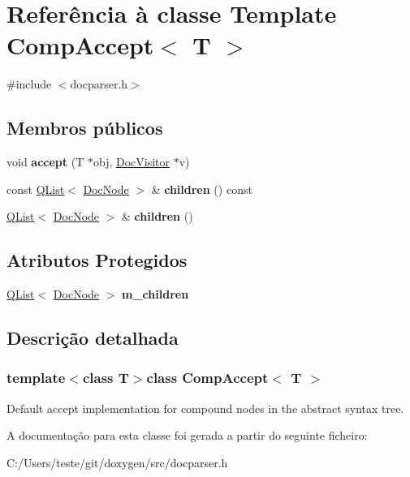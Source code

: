 \hypertarget{class_comp_accept}{\section{Referência à classe Template Comp\-Accept$<$ T $>$}
\label{class_comp_accept}
}


{\ttfamily \#include $<$docparser.\-h$>$}

\subsection*{Membros públicos}
\begin{DoxyCompactItemize}
\item 
\hypertarget{class_comp_accept_a214a555f143a48b4b2caa08749e31399}{void {\bfseries accept} (T $\ast$obj, \hyperlink{class_doc_visitor}{Doc\-Visitor} $\ast$v)}\label{class_comp_accept_a214a555f143a48b4b2caa08749e31399}

\item 
\hypertarget{class_comp_accept_ad3fb44a64388993cc1e83bed69247ab4}{const \hyperlink{class_q_list}{Q\-List}$<$ \hyperlink{class_doc_node}{Doc\-Node} $>$ \& {\bfseries children} () const }\label{class_comp_accept_ad3fb44a64388993cc1e83bed69247ab4}

\item 
\hypertarget{class_comp_accept_a73a5719c193020c21a70945ad0930194}{\hyperlink{class_q_list}{Q\-List}$<$ \hyperlink{class_doc_node}{Doc\-Node} $>$ \& {\bfseries children} ()}\label{class_comp_accept_a73a5719c193020c21a70945ad0930194}

\end{DoxyCompactItemize}
\subsection*{Atributos Protegidos}
\begin{DoxyCompactItemize}
\item 
\hypertarget{class_comp_accept_aa23f4e1147759ed4d719c1a4cdc62615}{\hyperlink{class_q_list}{Q\-List}$<$ \hyperlink{class_doc_node}{Doc\-Node} $>$ {\bfseries m\-\_\-children}}\label{class_comp_accept_aa23f4e1147759ed4d719c1a4cdc62615}

\end{DoxyCompactItemize}


\subsection{Descrição detalhada}
\subsubsection*{template$<$class T$>$class Comp\-Accept$<$ T $>$}

Default accept implementation for compound nodes in the abstract syntax tree. 

A documentação para esta classe foi gerada a partir do seguinte ficheiro\-:\begin{DoxyCompactItemize}
\item 
C\-:/\-Users/teste/git/doxygen/src/docparser.\-h\end{DoxyCompactItemize}
